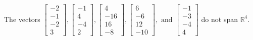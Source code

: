 \begin{exercise}
\begin{exerciseStatement}
  \end{exerciseStatement}
  \begin{exerciseAnswer}
   The vectors \(\left[\begin{array}{r}
-2 \\
-1 \\
-2 \\
3
\end{array}\right] , \left[\begin{array}{r}
-1 \\
4 \\
-4 \\
2
\end{array}\right] , \left[\begin{array}{r}
4 \\
-16 \\
16 \\
-8
\end{array}\right] , \left[\begin{array}{r}
6 \\
-6 \\
12 \\
-10
\end{array}\right] , \text{ and } \left[\begin{array}{r}
-1 \\
-3 \\
-4 \\
4
\end{array}\right]\) 
  	 do not  
	span \(\mathbb{R}^4\).
  


  \end{exerciseAnswer}
\end{exercise}